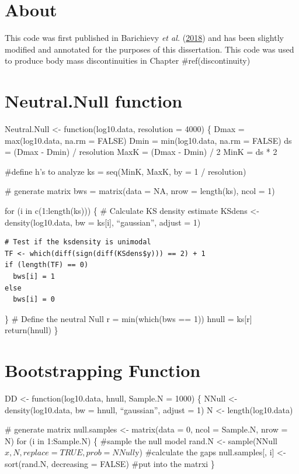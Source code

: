 \documentclass[12pt,twoside,openany]{reedthesis}
\begin{document}
\hypertarget{about}{%
\section{About}\label{about}}

This code was first published in Barichievy \emph{et al.} (\protect\hyperlink{ref-barichievy2018method}{2018}) and has been slightly modified and annotated for the purposes of this dissertation. This code was used to produce body mass discontinuities in Chapter \#ref(discontinuity)

\hypertarget{neutral.null-function}{%
\section{Neutral.Null function}\label{neutral.null-function}}

Neutral.Null \textless- function(log10.data, resolution = 4000) \{
Dmax = max(log10.data, na.rm = FALSE)
Dmin = min(log10.data, na.rm = FALSE)
ds = (Dmax - Dmin) / resolution
MaxK = (Dmax - Dmin) / 2
MinK = ds * 2

\#define h's to analyze
ks = seq(MinK, MaxK, by = 1 / resolution)

\# generate matrix
bws = matrix(data = NA,
nrow = length(ks),
ncol = 1)

for (i in c(1:length(ks))) \{
\# Calculate KS density estimate
KSdens \textless- density(log10.data, bw = ks{[}i{]}, ``gaussian'', adjust = 1)
\begin{verbatim}
# Test if the ksdensity is unimodal
TF <- which(diff(sign(diff(KSdens$y))) == 2) + 1
if (length(TF) == 0)
  bws[i] = 1
else
  bws[i] = 0
\end{verbatim}
\}
\# Define the neutral Null
r = min(which(bws == 1))
hnull = ks{[}r{]}
return(hnull)
\}

\hypertarget{bootstrapping-function}{%
\section{Bootstrapping Function}\label{bootstrapping-function}}

DD \textless- function(log10.data, hnull, Sample.N = 1000) \{
NNull \textless- density(log10.data, bw = hnull, ``gaussian'', adjust = 1)
N \textless- length(log10.data)

\# generate matrix
null.samples \textless- matrix(data = 0,
ncol = Sample.N,
nrow = N)
for (i in 1:Sample.N) \{
\#sample the null model
rand.N \textless- sample(NNull\(x, N, replace = TRUE, prob = NNull\)y)
\#calculate the gaps
null.samples{[}, i{]} \textless- sort(rand.N, decreasing = FALSE)
\#put into the matrxi
\}
\end{document}
